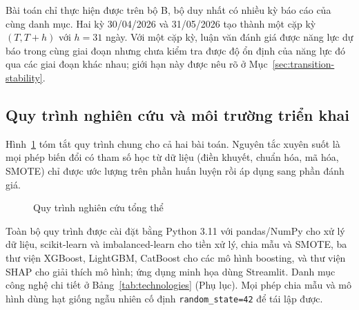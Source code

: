 Bài toán chỉ thực hiện được trên bộ B, bộ duy nhất có nhiều kỳ báo cáo của cùng danh mục. Hai kỳ 30/04/2026 và 31/05/2026 tạo thành một cặp kỳ $(T,T+h)$ với $h=31$ ngày. Với một cặp kỳ, luận văn đánh giá được năng lực dự báo trong cùng giai đoạn nhưng chưa kiểm tra được độ ổn định của năng lực đó qua các giai đoạn khác nhau; giới hạn này được nêu rõ ở Mục~\ref{sec:transition-stability}.

\subsection{Quy trình nghiên cứu và môi trường triển khai}
\label{sec:pipeline-overview}

Hình~\ref{fig:experimental-pipeline} tóm tắt quy trình chung cho cả hai bài toán. Nguyên tắc xuyên suốt là mọi phép biến đổi có tham số học từ dữ liệu (điền khuyết, chuẩn hóa, mã hóa, SMOTE) chỉ được ước lượng trên phần huấn luyện rồi áp dụng sang phần đánh giá.

\begin{figure}[H]
\centering
{}
\caption{Quy trình nghiên cứu tổng thể}
\label{fig:experimental-pipeline}
\end{figure}

Toàn bộ quy trình được cài đặt bằng Python 3.11 với pandas/NumPy cho xử lý dữ liệu, scikit-learn và imbalanced-learn cho tiền xử lý, chia mẫu và SMOTE, ba thư viện XGBoost, LightGBM, CatBoost cho các mô hình boosting, và thư viện SHAP \cite{shap_docs} cho giải thích mô hình; ứng dụng minh họa dùng Streamlit. Danh mục công nghệ chi tiết ở Bảng~\ref{tab:technologies} (Phụ lục). Mọi phép chia mẫu và mô hình dùng hạt giống ngẫu nhiên cố định \mbox{\texttt{random\_state=42}} để tái lập được.

